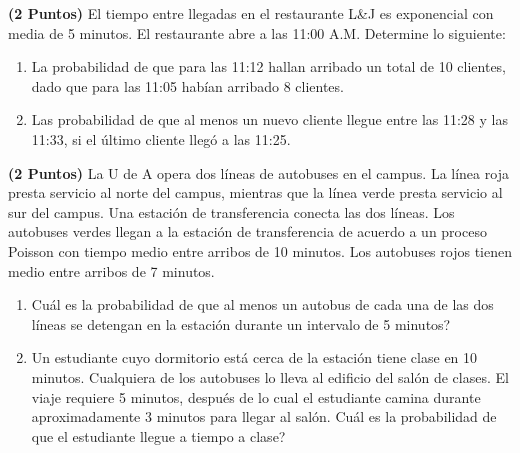 \documentclass[ a4paper, twoside, 11pt]{article}
\begin{document}
\begin{problem}
\textbf{(2 Puntos)} El tiempo entre llegadas en el restaurante L\&J es exponencial con media de 5 minutos. El restaurante abre a las 11:00 A.M. Determine lo siguiente: 
\begin{enumerate}[label=\alph*)]
\item La probabilidad de que para las 11:12 hallan arribado un total de 10 clientes, dado que para las 11:05 hab\'ian arribado 8 clientes. 
\item Las probabilidad de que al menos un nuevo cliente llegue entre las 11:28 y las 11:33, si el \'ultimo cliente lleg\'o a las 11:25. 
\end{enumerate}

\end{problem}
\vspace{\baselineskip}

\begin{problem}
\textbf{(2 Puntos)} La U de A opera dos l\'ineas de autobuses en el campus. \linebreak La l\'inea roja presta servicio al norte del campus, mientras que la l\'inea verde presta servicio \linebreak al sur del campus. Una estaci\'on de transferencia conecta las dos l\'ineas. Los autobuses verdes llegan a la estaci\'on de transferencia de acuerdo a un proceso Poisson con tiempo medio entre arribos de 10 minutos. Los autobuses rojos tienen medio entre arribos de 7 minutos. 
\begin{enumerate}[label=\alph*)]
\item Cu\'al es la probabilidad de que al menos un autobus de cada una de las dos l\'ineas se detengan en la estaci\'on durante un intervalo de 5 minutos?
\item Un estudiante cuyo dormitorio est\'a cerca de la estaci\'on tiene clase en 10 minutos. Cualquiera de los autobuses lo lleva al edificio del sal\'on de clases. El viaje requiere 5 minutos, despu\'es de lo cual el estudiante camina durante aproximadamente 3 minutos para llegar al sal\'on. Cu\'al es la probabilidad de que el estudiante llegue a tiempo a clase?
\end{enumerate}

\end{problem}
\vspace{\baselineskip}
\end{document}
